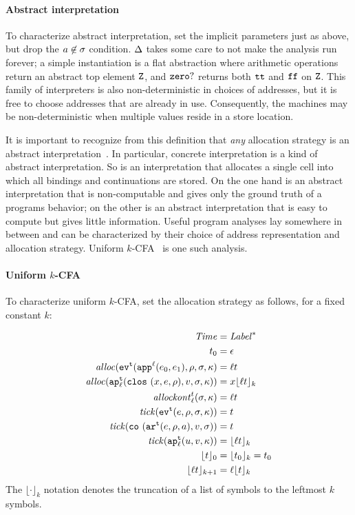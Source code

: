 \documentclass[preprint,onecolumn,9pt]{sigplanconf} %
\begin{document}
\paragraph{Abstract interpretation} To characterize abstract
interpretation, set the implicit parameters just as above, but drop
the $\maddr \not\in \msto$ condition. $\interpdelta$ takes some care
to not make the analysis run forever; a simple instantiation is a flat
abstraction where arithmetic operations return an abstract top element
$\sNum$, and $\szerohuh$ returns both $\strue$ and $\sfalse$ on
$\sNum$.  This family of interpreters is also non-deterministic in
choices of addresses, but it is free to choose addresses that are
already in use.  Consequently, the machines may be non-deterministic
when multiple values reside in a store location.

It is important to recognize from this definition that \emph{any}
allocation strategy is an abstract
interpretation~\cite{dvanhorn:Might2009Posteriori}.  In particular,
concrete interpretation is a kind of abstract interpretation.  So is
an interpretation that allocates a single cell into which all bindings
and continuations are stored.  On the one hand is an abstract
interpretation that is non-computable and gives only the ground truth
of a programs behavior; on the other is an abstract interpretation
that is easy to compute but gives little information.  Useful program
analyses lay somewhere in between and can be characterized by their
choice of address representation and allocation strategy.  Uniform
\(k\)-CFA~\cite{dvanhorn:nielson-nielson-popl97} is one such analysis.

\paragraph{Uniform \(k\)-CFA} To characterize uniform \(k\)-CFA, set the allocation
strategy as follows, for a fixed constant \(k\):

\begin{align*}
\Counter &= \Label^* \\
\mtcntr &= \epsilon \\
\alloc(\ev[^\mcntr]{\sapp[^\mlab]{\mexpi0}{\mexpi1},\menv,\msto,\mkont} &= \mlab\mcntr \\
\alloc(\ap[^\mcntr_\mlab]{\clos{\mvar,\mexp,\menv},\mval,\msto,\mkont}) &= \mvar\kpush[_k]{\mlab\mcntr} \\
\allockont^\mcntr_\mlab(\msto,\mkont) &= \mlab\mcntr \\
\tick(\ev[^\mcntr]{\mexp,\menv,\msto,\mkont}) &= \mcntr \\
\tick(\co{\kar[^\mcntr]{\mexp,\menv,\maddr},\mval,\msto}) &= \mcntr \\
\tick(\ap[^\mcntr_\mlab]{\mvalx{u},\mval,\mkont}) &= \kpush[_k]{\mlab\mcntr} \\
  \kpush[_0]{\mcntr} &= \kpush[_k]{\mtcntr} = \mtcntr \\
  \kpush[_{k+1}]{\mlab\mcntr} &= \mlab\kpush[_k]{\mcntr} \\
\end{align*}
The \(\lfloor\cdot\rfloor_k\) notation denotes the truncation of a list
of symbols to the leftmost \(k\) symbols.
\end{document}
